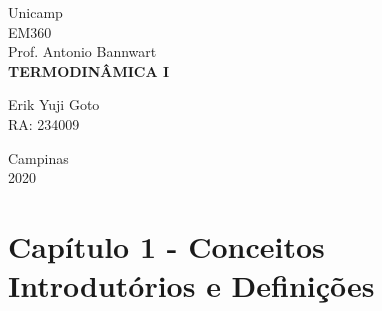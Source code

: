 \documentclass[a4paper, 12pt]{article}
\begin{document}
\begin{titlepage} %
	\begin{center} %
		{\large Unicamp}\\[0.2cm] %
		{\large EM360}\\[0.2cm] %
		{\large Prof. Antonio Bannwart}\\[3.2cm]
		{\bf \huge TERMODINÂMICA I}\\[5.1cm] %
	\end{center} %
	{\large Erik Yuji Goto}\\[0.5cm] %
	{\large RA: 234009}\\[10cm]
	\begin{center}
		{\large Campinas}\\[0.2cm]
		{\large 2020}
	\end{center}
\end{titlepage} %

\tableofcontents
\newpage

\section{Capítulo 1 - Conceitos Introdutórios e Definições}
\end{document}
